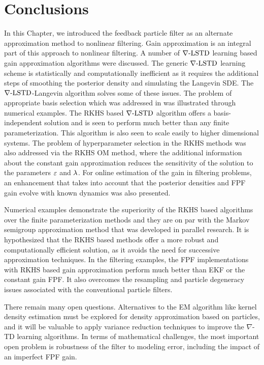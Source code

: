 \section{Conclusions}
\label{s:ch4_conclusions}
In this Chapter, we introduced the feedback particle filter as an alternate approximation method to nonlinear filtering. Gain approximation is an integral part of this approach to nonlinear filtering. A number of $\nabla\text{-LSTD}$ learning based gain approximation algorithms were discussed. The generic $\nabla\text{-LSTD}$ learning scheme is statistically and computationally inefficient as it requires the additional steps of smoothing the posterior density and simulating the Langevin SDE. The $\nabla\text{-LSTD}$-Langevin algorithm solves some of these issues. The problem of appropriate basis selection which was addressed in  was illustrated through numerical examples. The RKHS based $\nabla\text{-LSTD}$ algorithm offers a basis-independent solution and is seen to perform much better than any finite parameterization. This algorithm is also seen to scale easily to higher dimensional systems. The problem of hyperparameter selection in the RKHS methods was also addressed via the RKHS OM method, where the additional information about the constant gain approximation reduces the sensitivity of the solution to the parameters $\varepsilon$ and $\lambda$. For online estimation of the gain in filtering problems, an enhancement that takes into account that the posterior densities and FPF gain evolve with known dynamics was also presented. 

Numerical examples demonstrate the superiority of the RKHS based algorithms over the finite parameterization methods and they are on par with the Markov semigroup approximation method that was developed in parallel research. It is hypothesized that the RKHS based methods offer a more robust and computationally efficient solution, as it avoids the need for successive approximation techniques. In the filtering examples, the FPF implementations with RKHS based gain approximation perform much better than EKF or the constant gain FPF. It also overcomes the resampling and particle degeneracy issues associated with the conventional particle filters. 

There remain many open questions.   Alternatives to the EM algorithm like kernel density estimation must be explored for density approximation based on particles,  and it will be valuable to apply variance reduction techniques to improve the $\nabla$-TD learning algorithms. In terms of mathematical challenges, the most important open problem is robustness of the filter to modeling error, including the impact of an imperfect FPF gain.
